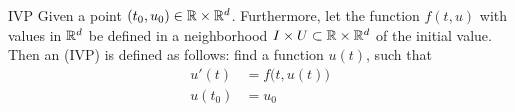 \begin{Definition}{IVP}
   Given a point
  $(t_0,u_0)\in \mathbb R \times \mathbb R^d$.  Furthermore, let the function
  $f(t,u)$ with values in $\mathbb R^d$ be defined in a neighborhood
  $I\times U \subset \mathbb R\times \mathbb R^d$ of the initial value.  Then an
   (IVP) is defined as follows: find a
  function $u(t)$, such that
  \begin{subequations}
    \label{eq:awa}
    \begin{align}
      \label{eq:awa:2}
      u'(t)&=f\bigl(t,u(t)\bigr)
      \\
      \label{eq:awa:3}
      u(t_0)&=u_0
  \end{align}
  \end{subequations}
\end{Definition}